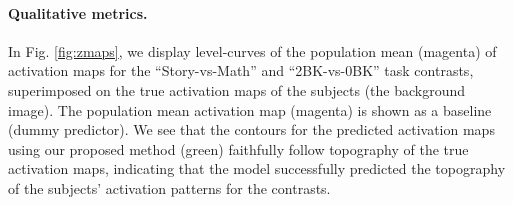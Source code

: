 

\paragraph{Qualitative metrics.} In Fig. \ref{fig:zmaps}, we display level-curves of the population mean (magenta) of
activation maps for the ``Story-vs-Math'' and ``2BK-vs-0BK'' task contrasts, superimposed on the true activation maps of the
subjects (the background image).  The population mean activation map (magenta) is shown as a baseline (dummy predictor).
We see that the contours for the predicted activation maps using our proposed method (green)
faithfully follow topography of the true activation maps, indicating that the model successfully
predicted the topography of the subjects' activation patterns for the contrasts.


